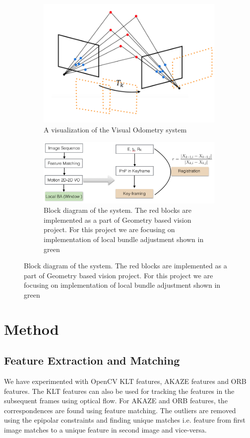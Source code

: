 \documentclass[12pt,twocolumn,letterpaper]{article}
\begin{document}
\begin{figure}
    \centering
    \begin{subfigure}{.4\textwidth}
        \includegraphics[width=\textwidth]{images/system}
        \caption{A visualization of the Visual Odometry system}
        \label{fig:system}
    \end{subfigure}
    \begin{subfigure}{.5\textwidth}
        \includegraphics[width=\textwidth]{images/block}
        \caption{Block diagram of the system. The red blocks are implemented as a part of Geometry based vision project. For this project we are focusing on implementation of local bundle adjustment shown in green}
        \label{fig:block}
    \end{subfigure}
\end{figure}

\section{Method}

\subsection{Feature Extraction and Matching}
We have experimented with OpenCV KLT features, AKAZE features and ORB features. The KLT features can also be used for tracking the features in the subsequent frames using optical flow. For AKAZE\cite{akaze} and ORB features, the correspondences are found using feature matching. The outliers are removed using the epipolar constraints and finding unique matches i.e. feature from first image matches to a unique feature in second image and vice-versa.
\end{document}
